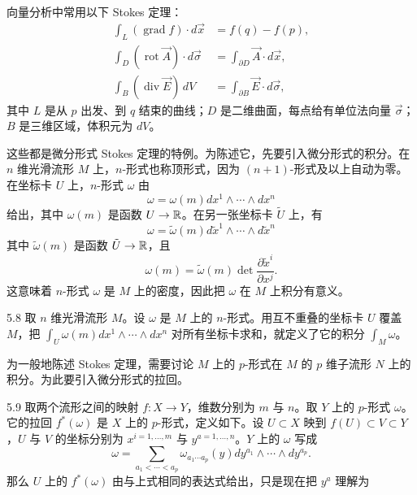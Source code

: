 向量分析中常用以下 Stokes 定理：
\begin{align}
  \int_L(\operatorname{grad}f)\cdot d\vec x&=f(q)-f(p), \tag{5.24}\\
  \int_D(\operatorname{rot}\vec A)\cdot d\vec\sigma&=\int_{\partial D}\vec A\cdot d\vec x, \tag{5.25}\\
  \int_B(\operatorname{div}\vec E)\,dV&=\int_{\partial B}\vec E\cdot d\vec\sigma, \tag{5.26}
\end{align}
其中 $L$ 是从 $p$ 出发、到 $q$ 结束的曲线；$D$ 是二维曲面，每点给有单位法向量 $\vec\sigma$；$B$ 是三维区域，体积元为 $dV$。

这些都是微分形式 Stokes 定理的特例。为陈述它，先要引入微分形式的积分。在 $n$ 维光滑流形 $M$ 上，$n$-形式也称顶形式，因为 $(n+1)$-形式及以上自动为零。在坐标卡 $U$ 上，$n$-形式 $\omega$ 由
\begin{equation}
  \omega=\omega(m)dx^1\wedge\cdots\wedge dx^n
  \tag{5.27}
\end{equation}
给出，其中 $\omega(m)$ 是函数 $U\to\mathbb{R}$。在另一张坐标卡 $\tilde U$ 上，有
\begin{equation}
  \omega=\tilde\omega(m)d\tilde x^1\wedge\cdots\wedge d\tilde x^n
  \tag{5.28}
\end{equation}
其中 $\tilde\omega(m)$ 是函数 $\tilde U\to\mathbb{R}$，且
\begin{equation}
  \omega(m)=\tilde\omega(m)\det\frac{\partial\tilde x^i}{\partial x^j}.
  \tag{5.29}
\end{equation}
这意味着 $n$-形式 $\omega$ 是 $M$ 上的密度，因此把 $\omega$ 在 $M$ 上积分有意义。

\begin{definition}{5.8}
  取 $n$ 维光滑流形 $M$。设 $\omega$ 是 $M$ 上的 $n$-形式。用互不重叠的坐标卡 $U$ 覆盖 $M$，把 $\int_U\omega(m)dx^1\wedge\cdots\wedge dx^n$ 对所有坐标卡求和，就定义了它的积分 $\int_M\omega$。
\end{definition}

为一般地陈述 Stokes 定理，需要讨论 $M$ 上的 $p$-形式在 $M$ 的 $p$ 维子流形 $N$ 上的积分。为此要引入微分形式的拉回。

\begin{definition}{5.9}
  取两个流形之间的映射 $f:X\to Y$，维数分别为 $m$ 与 $n$。取 $Y$ 上的 $p$-形式 $\omega$。它的拉回 $f^*(\omega)$ 是 $X$ 上的 $p$-形式，定义如下。设 $U\subset X$ 映到 $f(U)\subset V\subset Y$，$U$ 与 $V$ 的坐标分别为 $x^{i=1,\dots,m}$ 与 $y^{a=1,\dots,n}$。$Y$ 上的 $\omega$ 写成
  \begin{equation}
    \omega=\sum_{a_1<\cdots<a_p}\omega_{a_1\cdots a_p}(y)dy^{a_1}\wedge\cdots\wedge dy^{a_p}.
    \tag{5.30}
  \end{equation}
  那么 $U$ 上的 $f^*(\omega)$ 由与上式相同的表达式给出，只是现在把 $y^a$ 理解为
\end{definition}

